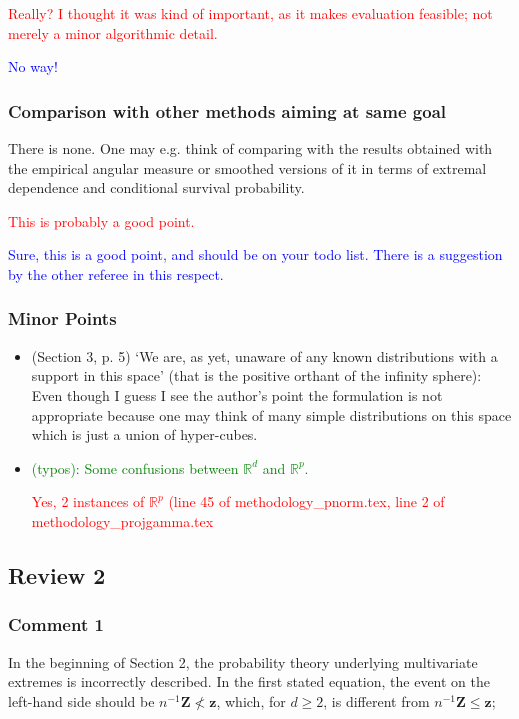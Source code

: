 \documentclass[10pt]{article}
\newcommand{\bruno}[1]{\textcolor{blue}{#1}} %
\newcommand{\peter}[1]{\textcolor{red}{#1}}  %
\newcommand{\handled}[1]{\textcolor{green}{#1}} %
\begin{document}
\peter{Really?  I thought it was kind of important, as it makes evaluation feasible; not merely a minor algorithmic detail.}

\bruno{No way!}

\subsubsection*{Comparison with other methods aiming at same goal}
There is none. One may e.g. think of comparing with the results obtained with the empirical angular measure or smoothed versions of it in terms of extremal dependence and conditional survival probability.

\peter{This is probably a good point.}

\bruno{Sure, this is a good point, and should be on your todo list. There is a suggestion by the other referee in this respect.}

\subsubsection*{Minor Points}
\begin{itemize}
    \item (Section 3, p. 5) ‘We are, as yet, unaware of any known distributions with a support in this space’ (that is the positive orthant of the infinity sphere): Even though I guess I see the author’s point the formulation is not appropriate because one may think of many simple distributions on this space which is just a union of hyper-cubes.
    
    \item  \handled{(typos): Some confusions between ${\mathbb R}^d$ and $\mathbb{R}^p$.}
    
    \peter{Yes, 2 instances of $\mathbb{R}^p$ (line 45 of methodology\_pnorm.tex, line 2 of methodology\_projgamma.tex}
    
\end{itemize}


\subsection*{Review 2}
\subsubsection*{Comment 1}
In the beginning of Section 2, the probability theory underlying multivariate extremes is incorrectly described. In the first stated equation, the event on the left-hand side should be $n^{-1}\bm{Z} \not < \bm{z}$, which, for $d \geq 2$, is different from $n^{-1}\bm{Z}\leq \bm{z}$;
\end{document}

